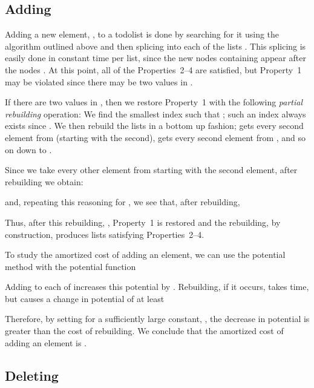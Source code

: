 \documentclass{patmorin}
\begin{document}
\vspace{1ex}
\noindent{}
\begin{algorithmic}
  \STATE{}
  \FOR{}
      \STATE{}
    \ENDIF
    \STATE{}
  \ENDFOR
  \RETURN{}
\end{algorithmic}

\subsection{Adding}

Adding a new element, , to a todolist is done by searching for it
using the algorithm outlined above and then splicing  into each of
the lists .  This splicing is easily done in constant
time per list, since the new nodes containing  appear after the nodes
.  At this point, all of the Properties~2--4 are satisfied,
but Property~1 may be violated since there may be two values in .

If there are two values in , then we restore Property~1 with the
following \emph{partial rebuilding} operation: We find the smallest index
 such that ; such an index always exists since
.  We then rebuild the lists 
in a bottom up fashion;  gets every second element from 
(starting with the second),  gets every second element from
, and so on down to .

Since we take every other element from  starting with the second element,
after rebuilding we obtain:

and, repeating this reasoning for , we see that, after rebuilding,

Thus, after this rebuilding, , Property~1 is restored and the
rebuilding, by construction, produces lists satisfying Properties~2--4.

To study the amortized cost of adding an element, we
can use the potential method with the potential function

Adding  to each of  increases this potential by
.  Rebuilding, if it occurs, takes 
time, but causes a change in potential of at least

Therefore, by setting  for a sufficiently large constant,
, the decrease in potential is greater than the cost of rebuilding.
We conclude that the amortized cost of adding an element  is .

\subsection{Deleting}
\end{document}
